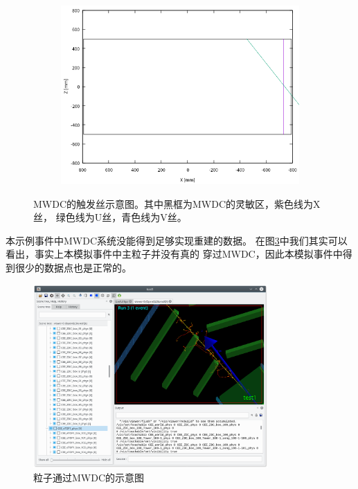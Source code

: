 \documentclass[bachelor,openany,oneside,color]{buaathesis}
\begin{document}
\begin{figure}
\begin{subfigure}[c]{0.3\linewidth}
		\includegraphics[width=\textwidth]{./resource/MWDC3-result.png}
		\label{fig:result:MWDC3}
	\end{subfigure}
	\caption{MWDC的触发丝示意图。其中黑框为MWDC的灵敏区，紫色线为X丝，
		绿色线为U丝，青色线为V丝。}
	\label{fig:result:MWDC}
\end{figure}

本示例事件中MWDC系统没能得到足够实现重建的数据。
在图\ref{fig:MWDC:EventDisplay}中我们其实可以看出，事实上本模拟事件中主粒子并没有真的
穿过MWDC，因此本模拟事件中得到很少的数据点也是正常的。

\begin{figure}
	\centering
	\includegraphics[width=0.8\textwidth]{./resource/MWDC-EventDisplay.png}
	\caption{粒子通过MWDC的示意图}
	\label{fig:MWDC:EventDisplay}
\end{figure}
\end{document}
